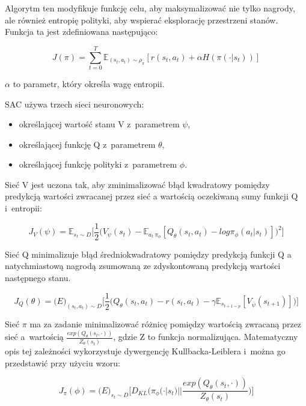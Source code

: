 \documentclass[a4paper,12pt]{article}
\begin{document}
Algorytm ten modyfikuje funkcję celu, aby maksymalizować nie tylko nagrody, ale również entropię polityki, aby wspierać eksplorację przestrzeni stanów. Funkcja ta jest zdefiniowana następująco:

\begin{equation}
	J(\pi) = \sum_{t=0}^T \mathbb{E}_{(s_t,a_t) \sim \rho_\pi} [r(s_t,a_t) + \alpha H(\pi(\cdot |s_t))]
\end{equation}

$\alpha$ to parametr, który określa wagę entropii.

SAC używa trzech sieci neuronowych:
\begin{itemize}
	\item określającej wartość stanu V z~parametrem $\psi$,
	\item określającej funkcję Q z~parametrem $\theta$,
	\item określającej funkcję polityki z~parametrem $\phi$.
\end{itemize}

Sieć V jest uczona tak, aby zminimalizować błąd  kwadratowy pomiędzy predykcją wartości zwracanej przez sieć a wartością oczekiwaną sumy funkcji Q i~entropii:

\begin{equation}
J_V(\psi) = \mathbb{E}_{s_t \sim D}\Big[ \frac{1}{2}\big(V_\psi(s_t) - \mathbb{E}_{a_t ~\pi_\phi} [Q_\theta(s_t,a_t) - log \pi_\phi (a_t|s_t)] \big)^2\Big]
\end{equation}

Sieć Q minimalizuje błąd średniokwadratowy pomiędzy predykcją funkcji Q a natychmiastową nagrodą zsumowaną ze zdyskontowaną predykcją wartości następnego stanu.

\begin{equation}
	J_Q(\theta) = \mathbb(E)_{(s_t,a_t) \sim D}\Big[
		\frac{1}{2} \big(
			Q_\theta(s_t,a_t) - r(s_t,a_t) - \gamma \mathbb{E}_{s_{t+1 \sim p}}[V_{\bar{\psi}}(s_{t+1})]
		\big)
	\Big]
\end{equation}

Sieć $\pi$ ma za zadanie minimalizować różnicę pomiędzy wartością zwracaną przez sieć  a~wartością $\frac{exp(Q_\theta(s_t,\cdot))}{Z_\theta(s_t)}$, gdzie Z to funkcja normalizująca. Matematyczny opis tej zależności wykorzystuje dywergencję Kullbacka-Leiblera i~można go przedstawić przy użyciu wzoru:

\begin{equation}
	J_\pi(\phi) = \mathbb(E)_{s_t \sim D}\Big[ D_{KL} \big(\pi_\phi(\cdot|s_t) || \frac{exp(Q_\theta(s_t,\cdot))}{Z_\theta(s_t)}  \big) \Big]
\end{equation}
\end{document}
